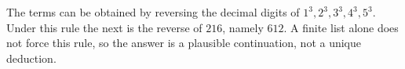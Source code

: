The terms can be obtained by reversing the decimal digits of $1^3,2^3,3^3,4^3,5^3$. Under this rule the next is the reverse of $216$, namely $\boxed{612}$. A finite list alone does not force this rule, so the answer is a plausible continuation, not a unique deduction.
